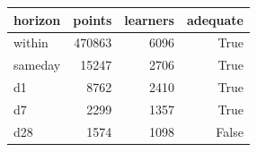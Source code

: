 \begin{tabular}{lrrr}
\toprule
horizon & points & learners & adequate \\
\midrule
within & 470863 & 6096 & True \\
sameday & 15247 & 2706 & True \\
d1 & 8762 & 2410 & True \\
d7 & 2299 & 1357 & True \\
d28 & 1574 & 1098 & False \\
\bottomrule
\end{tabular}
